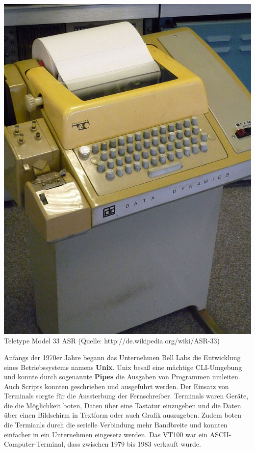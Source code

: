 \documentclass[12pt,a4paper]{report}
\begin{document}
\begin{onehalfspace}
\begin{center}
\includegraphics[scale=0.52]{img/teletype.jpg}\\
Teletype Model 33 ASR (Quelle: http://de.wikipedia.org/wiki/ASR-33)
\end{center}

Anfangs der 1970er Jahre begann das Unternehmen Bell Labs die Entwicklung eines Betriebssystems namens \textbf{Unix}. Unix besaß eine mächtige CLI-Umgebung und konnte durch sogenannte \textbf{Pipes} die Ausgaben von Programmen umleiten. Auch Scripts konnten geschrieben und ausgeführt werden. Der Einsatz von Terminals sorgte für die Aussterbung der Fernschreiber. Terminals waren Geräte, die die Möglichkeit boten, Daten über eine Tastatur einzugeben und die Daten über einen Bildschirm in Textform oder auch Grafik auszugeben. Zudem boten die Termianls durch die serielle Verbindung mehr Bandbreite und konnten einfacher in ein Unternehmen eingesetz werden. Das VT100 war ein ASCII-Computer-Terminal, dass zwischen 1979 bis 1983 verkauft wurde.\\


\end{onehalfspace}
\end{document}
